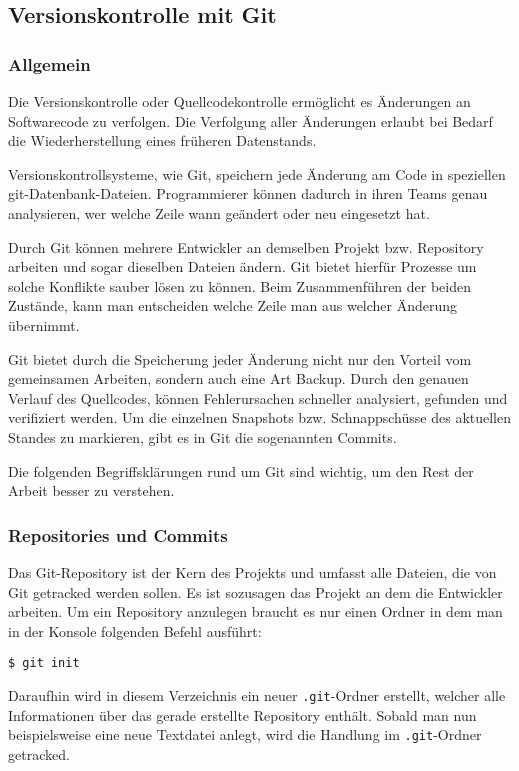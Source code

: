 \subsection{Versionskontrolle mit Git}
\subsubsection{Allgemein}

Die Versionskontrolle oder Quellcodekontrolle ermöglicht es Änderungen an
Softwarecode zu verfolgen. Die Verfolgung aller Änderungen erlaubt bei Bedarf
die Wiederherstellung eines früheren Datenstands.

Versionskontrollsysteme, wie Git, speichern jede Änderung am Code in speziellen
git-Datenbank-Dateien. Programmierer können dadurch in ihren Teams genau
analysieren, wer welche Zeile wann geändert oder neu eingesetzt hat.

Durch Git können mehrere Entwickler an demselben Projekt bzw. Repository
arbeiten und sogar dieselben Dateien ändern. Git bietet hierfür Prozesse um
solche Konflikte sauber lösen zu können. Beim Zusammenführen der beiden
Zustände, kann man entscheiden welche Zeile man aus welcher Änderung übernimmt.

Git bietet durch die Speicherung jeder Änderung nicht nur den Vorteil vom
gemeinsamen Arbeiten, sondern auch eine Art \glqq Backup\grqq{}. Durch den
genauen Verlauf des Quellcodes, können Fehlerursachen schneller analysiert,
gefunden und verifiziert werden. Um die einzelnen Snapshots bzw. Schnappschüsse
des aktuellen Standes zu markieren, gibt es in Git die sogenannten Commits.

Die folgenden Begriffsklärungen rund um Git sind wichtig, um den Rest der Arbeit
besser zu verstehen.

\subsubsection{Repositories und Commits}
Das Git-Repository ist der Kern des Projekts und umfasst alle Dateien, die von
Git getracked werden sollen. Es ist sozusagen das Projekt an dem die Entwickler
arbeiten. Um ein Repository anzulegen braucht es nur einen Ordner in dem man
in der Konsole folgenden Befehl ausführt:
\begin{lstlisting}[style=Bash]
    $ git init
\end{lstlisting}
Daraufhin wird in diesem Verzeichnis ein neuer \texttt{.git}-Ordner erstellt,
welcher alle Informationen über das gerade erstellte Repository enthält. Sobald
man nun beispielsweise eine neue Textdatei anlegt, wird die Handlung im
\texttt{.git}-Ordner getracked.

